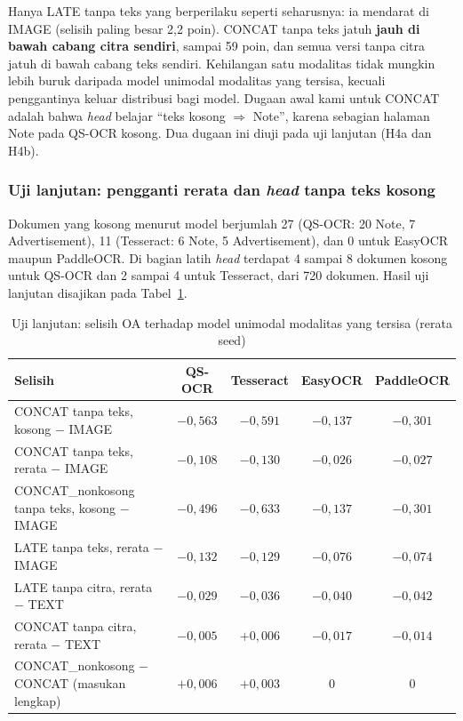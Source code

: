 Hanya LATE tanpa teks yang berperilaku seperti seharusnya: ia mendarat di IMAGE (selisih
paling besar 2,2 poin). CONCAT tanpa teks jatuh \textbf{jauh di bawah cabang citra
sendiri}, sampai 59 poin, dan semua versi tanpa citra jatuh di bawah cabang teks sendiri.
Kehilangan satu modalitas tidak mungkin lebih buruk daripada model unimodal modalitas yang
tersisa, kecuali penggantinya keluar distribusi bagi model. Dugaan awal kami untuk CONCAT
adalah bahwa \textit{head} belajar \enquote{teks kosong $\Rightarrow$ Note}, karena
sebagian halaman Note pada QS-OCR kosong. Dua dugaan ini diuji pada uji lanjutan (H4a dan
H4b).

\subsubsection{Uji lanjutan: pengganti rerata dan \textit{head} tanpa teks kosong}

Dokumen yang kosong menurut model berjumlah 27 (QS-OCR: 20 Note, 7 Advertisement), 11
(Tesseract: 6 Note, 5 Advertisement), dan 0 untuk EasyOCR maupun PaddleOCR. Di bagian latih
\textit{head} terdapat 4 sampai 8 dokumen kosong untuk QS-OCR dan 2 sampai 4 untuk
Tesseract, dari 720 dokumen. Hasil uji lanjutan disajikan pada Tabel~\ref{tab:missing-lanjutan}.

\begin{table}[H]
  \centering
  \caption{Uji lanjutan: selisih OA terhadap model unimodal modalitas yang tersisa (rerata
  seed)}
  \label{tab:missing-lanjutan}
  \fontsize{10}{12}\selectfont
  \begin{tabularx}{\textwidth}{|>{\raggedright\arraybackslash}X|c|c|c|c|}
    \hline
    \textbf{Selisih} & \textbf{QS-OCR} & \textbf{Tesseract} & \textbf{EasyOCR} &
    \textbf{PaddleOCR} \\ \hline
    CONCAT tanpa teks, kosong $-$ IMAGE & $-0{,}563$ & $-0{,}591$ & $-0{,}137$ & $-0{,}301$ \\ \hline
    CONCAT tanpa teks, rerata $-$ IMAGE & $-0{,}108$ & $-0{,}130$ & $-0{,}026$ & $-0{,}027$ \\ \hline
    CONCAT\_nonkosong tanpa teks, kosong $-$ IMAGE & $-0{,}496$ & $-0{,}633$ & $-0{,}137$ & $-0{,}301$ \\ \hline
    LATE tanpa teks, rerata $-$ IMAGE & $-0{,}132$ & $-0{,}129$ & $-0{,}076$ & $-0{,}074$ \\ \hline
    LATE tanpa citra, rerata $-$ TEXT & $-0{,}029$ & $-0{,}036$ & $-0{,}040$ & $-0{,}042$ \\ \hline
    CONCAT tanpa citra, rerata $-$ TEXT & $-0{,}005$ & $+0{,}006$ & $-0{,}017$ & $-0{,}014$ \\ \hline
    CONCAT\_nonkosong $-$ CONCAT (masukan lengkap) & $+0{,}006$ & $+0{,}003$ & 0 & 0 \\ \hline
  \end{tabularx}
\end{table}

